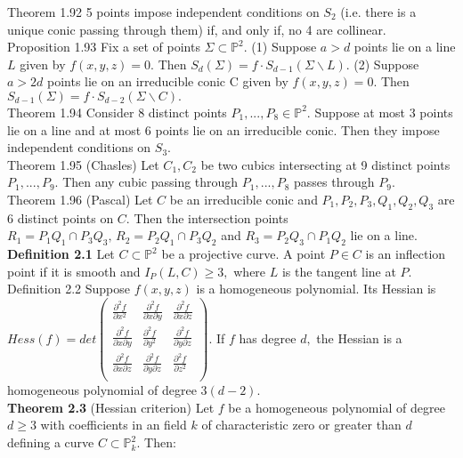 \documentclass[8pt]{extarticle}
\begin{document}
Theorem 1.92 5 points impose independent conditions on $S_2$ (i.e. there is a unique conic passing through them) if, and only if, no 4 are collinear.\\
Proposition 1.93 Fix a set of points $\Sigma \subset \mathbb{P}^2.$ (1) Suppose $a>d$ points lie on a line $L$ given by $f(x,y,z)=0.$ Then $S_d(\Sigma)=f\cdot S_{d-1}(\Sigma \backslash L).$ (2) Suppose $a>2d$ points lie on an irreducible conic C given by $f(x,y,z) = 0.$ Then $S_{d-1}(\Sigma) = f\cdot S_{d-2}(\Sigma\backslash C).$\\
Theorem 1.94 Consider 8 distinct points $P_1,...,P_8\in\mathbb{P}^2.$ Suppose at most 3 points lie on a line and at most 6 points lie on an irreducible conic. Then they impose independent conditions on $S_3.$\\
Theorem 1.95 (Chasles) Let $C_1, C_2$ be two cubics intersecting at 9 distinct points $P_1,...,P_9.$ Then any cubic passing through $P_1,...,P_8$ passes through $P_9.$\\
Theorem 1.96 (Pascal) Let $C$ be an irreducible conic and $P_1, P_2, P_3, Q_1, Q_2, Q_3$ are 6 distinct points on $C.$ Then the intersection points $R_1 = P_1Q_1 \cap P_3Q_3,\,R_2 = P_2Q_1 \cap P_3Q_2$ and $R_3 = P_2Q_3 \cap P_1Q_2$ lie on a line.\\
\textbf{Definition 2.1} Let $C \subset\mathbb{P}^2$ be a projective curve. A point $P \in C$ is an inflection point if it is smooth and $I_P (L, C ) \ge 3,$ where $L$ is the tangent line at $P.$\\
Definition 2.2 Suppose $f(x,y,z)$ is a homogeneous polynomial. Its Hessian is $Hess(f)=det
\begin{pmatrix}
\frac{\partial^2 f}{\partial x^2} & \frac{\partial^2 f}{\partial x\partial y} & \frac{\partial^2 f}{\partial x\partial z}\\
\frac{\partial^2 f}{\partial x\partial y} & \frac{\partial^2 f}{\partial y^2} & \frac{\partial^2 f}{\partial y\partial z}\\
\frac{\partial^2 f}{\partial x\partial z} & \frac{\partial^2 f}{\partial y\partial z} & \frac{\partial^2 f}{\partial z^2}\\
\end{pmatrix}.$
If $f$ has degree $d,$ the Hessian is a homogeneous polynomial of degree $3(d-2).$\\
\textbf{Theorem 2.3} (Hessian criterion) Let $f$ be a homogeneous polynomial of degree $d \ge 3$ with coefficients in
an field $k$ of characteristic zero or greater than $d$ defining a curve $C \subset \mathbb{P}^2_k.$ Then:\\
\end{document}
